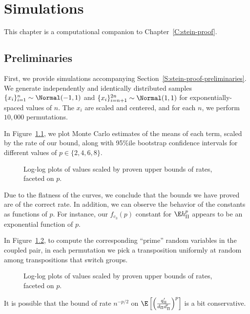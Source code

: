 \chapter{Simulations}
\label{C:simulations}
This chapter is a computational companion to Chapter~\ref{C:stein-proof}.

\section{Preliminaries}
First, we provide simulations accompanying
Section~\ref{S:stein-proof-preliminaries}.  We generate independently
and identically distributed samples $\{x_i\}_{i=1}^{n} \sim
\Normal(-1, 1)$ and $\{x_i\}_{i=n+1}^{2n} \sim \Normal(1, 1)$ for
exponentially-spaced values of $n$.  The $x_i$ are scaled and
centered, and for each $n$, we perform $10,000$ permutations.

In Figure~\ref{fig:siderates_1}, we plot Monte Carlo estimates of the
means of each term, scaled by the rate of our bound, along with
95\%ile bootstrap confidence intervals for different values of $p \in
\{2, 4, 6, 8\}$.

\begin{figure}[!ht]
  \centering
  
  \caption{Log-log plots of values scaled by proven upper bounds of
    rates, faceted on $p$.}
  \label{fig:siderates_1}
\end{figure}
Due to the flatness of the curves, we conclude that the bounds we have
proved are of the correct rate.  In addition, we can observe the
behavior of the constants as functions of $p$.  For instance, our
$f_{c_3}(p)$ constant for $\E h_{\Pi}^p$ appears to be an exponential
function of $p$.
\clearpage

In Figure~\ref{fig:siderates_2}, to compute the corresponding
``prime'' random variables in the coupled pair, in each permutation we
pick a transposition uniformly at random among transpositions that
switch groups.

\begin{figure}[!ht]
  \centering
  
  \caption{Log-log plots of values scaled by proven upper bounds of
    rates, faceted on $p$.}
  \label{fig:siderates_2}
\end{figure}
It is possible that the bound of rate $n^{-p/2}$ on
$\E \left [ \left ( \frac{q_{\Pi}'}{d_{\Pi}d_{\Pi}'} \right )^p \right ]$ is a bit conservative.
\clearpage

